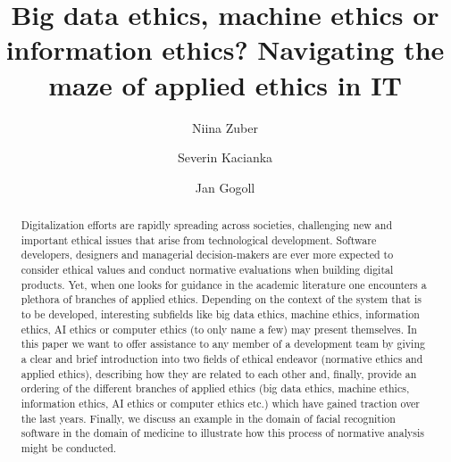 \documentclass[manuscript,screen]{acmart}
\begin{document}
\title{Big data ethics, machine ethics or information ethics? Navigating the maze of applied ethics in IT}

\author{Niina Zuber}

\author{Severin Kacianka}

\author{Jan Gogoll}




\renewcommand{\shortauthors}{Zuber et al.}

\begin{abstract}
Digitalization efforts are rapidly spreading across societies, challenging new and important ethical issues that arise from technological development. Software developers, designers and managerial decision-makers are ever more expected to consider ethical values and conduct normative evaluations when building digital products. Yet, when one looks for guidance in the academic literature one encounters a plethora of branches of applied ethics. Depending on the context of the system that is to be developed, interesting subfields like big data ethics, machine ethics, information ethics, AI ethics or computer ethics (to only name a few) may present themselves.  In this paper we want to offer assistance to any member of a development team by giving a clear and brief introduction into two fields of ethical endeavor (normative ethics and applied ethics), describing how they are related to each other and, finally, provide an ordering of the different branches of applied ethics (big data ethics, machine ethics, information ethics, AI ethics or computer ethics etc.) which have gained traction over the last years. Finally, we discuss an example in the domain of facial recognition software in the domain of medicine to illustrate how this process of normative analysis might be conducted.
\end{abstract}
\end{document}
